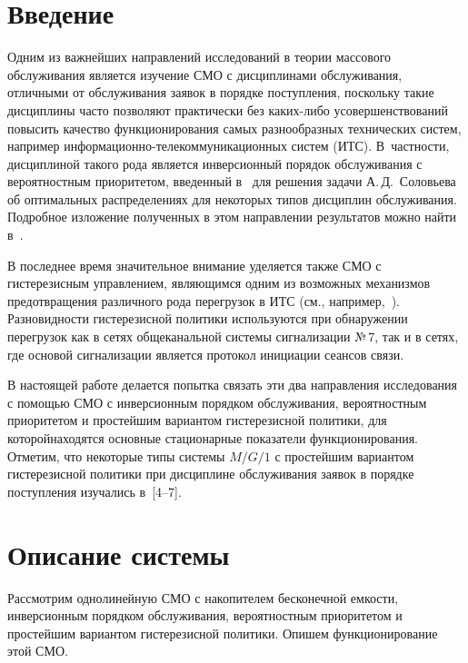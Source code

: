       \begin{multicols}{2}

            \label{st\stat}
            
\section{Введение}

Одним из важнейших направлений исследований в теории
массового обслуживания является изучение СМО с дисциплинами
обслуживания, отличны\-ми от обслуживания заявок в
порядке поступления, поскольку такие дисциплины
часто позволяют практически без каких-либо
усовершенствований повысить качество функционирования
самых разнообразных технических систем, например
ин\-фор\-ма\-ци\-он\-но-те\-ле\-ком\-му\-ни\-ка\-ци\-он\-ных сис\-тем (ИТС).
В~частности, дисциплиной такого рода является инверсионный
порядок обслуживания с вероятностным приоритетом,
введенный в~\cite{1-m} для решения задачи А.\,Д.~Соловьева
об оптимальных распределениях для некоторых типов
дисциплин обслуживания.
Подробное изложение полученных в этом направлении
результатов можно найти в~\cite{2-m}.

В последнее время значительное внимание уделяется также СМО с
гистерезисным управлением, являющимся одним из возможных механизмов
пред\-от\-вра\-ще\-ния различного рода перегрузок в ИТС (см., например,~\cite{3-m}). 
Разновидности гистерезисной политики используются при
обнаружении перегрузок как в сетях общеканальной системы
сигнализации №\,7, так и в сетях, где основой сигнализации является
протокол инициации сеансов связи.

В настоящей работе делается попытка связать эти два
направления исследования с по\-мощью СМО с инверсионным
порядком обслуживания, вероятностным приоритетом и
простейшим ва\-риантом гистерезисной политики, для
которой\linebreak находятся основные стационарные показатели
функционирования.
Отметим, что некоторые типы системы $M/G/1$ с
простейшим вариантом гистерезисной политики при
дисциплине обслуживания заявок в порядке поступления
изучались в~[4--7].

\section{Описание системы}

Рассмотрим однолинейную СМО с накопителем бесконечной
емкости, инверсионным
порядком обслуживания, вероятностным приоритетом и
простейшим вариантом гистерезисной политики.
Опишем функционирование этой СМО.


\end{multicols}
